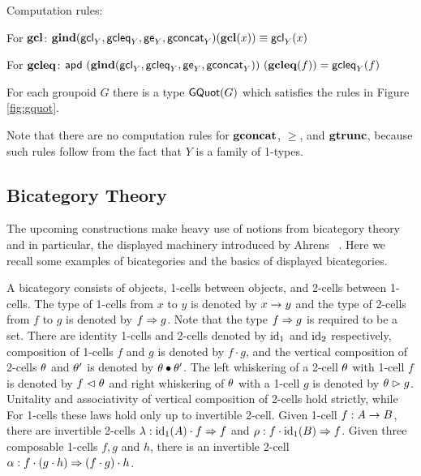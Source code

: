 \begin{figure*}[t]
\vspace{5pt}

Computation rules:

For $\gcl$: $\gind(\gclY, \gcleqY, \geY, \gconcatY)(\gcl(x)) \defeq \gclY(x)$

For $\gcleq$: $\apd{(\gind(\gclY, \gcleqY, \geY, \gconcatY))}{(\gcleq(f))} = \gcleqY(f)$
\caption{Introduction, elimination, and computation rules for the groupoid quotient \cite{sojakovaPhD}.}
\label{fig:gquot}
\end{figure*}

\begin{axiom}
For each groupoid $G$ there is a type $\gquotType(G)$ which satisfies the rules in Figure \ref{fig:gquot}.
\end{axiom}

Note that there are no computation rules for $\gconcat$, $\ge$, and $\gtrunc$,
because such rules follow from the fact that $Y$ is a family of 1-types.

\subsection{Bicategory Theory}
The upcoming constructions make heavy use of notions from bicategory theory \cite{10.1007/BFb0074299,leinster:basic-bicats}
and in particular, the displayed machinery introduced by Ahrens \etal \ \cite{bicatjournal}.
Here we recall some examples of bicategories and the basics of displayed bicategories.

A bicategory consists of objects, 1-cells between objects, and 2-cells between 1-cells.
The type of 1-cells from $x$ to $y$ is denoted by $x \onecell y$ and the type of 2-cells from $f$ to $g$ is denoted by $f \twocell g$.
Note that the type $f \twocell g$ is required to be a set.
There are identity 1-cells and 2-cells denoted by $\id_1$ and $\id_2$ respectively, composition of 1-cells $f$ and $g$ is denoted by $f \cdot g$,
and the vertical composition of 2-cells $\tc$ and $\tc'$ is denoted by $\tc \vcomp \tc'$.
The left whiskering of a 2-cell $\tc$ with 1-cell $f$ is denoted by $f \whiskerl \tc$ and right whiskering of $\tc$ with a 1-cell $g$ is denoted by $\tc \whiskerr g$. 
Unitality and associativity of vertical composition of 2-cells hold strictly, while For 1-cells these laws hold only up to invertible 2-cell. Given 1-cell $f : A \onecell B$, there are invertible 2-cells $\lunitor{f} : \id_1(A) \cdot f \twocell f$ and $\runitor{f} : f \cdot \id_1(B) \twocell f$.
Given three composable 1-cells $f,g$ and $h$, there is an invertible 2-cell $\lassoc{f}{g}{h} : f \cdot (g \cdot h) \twocell (f \cdot g) \cdot h$.

